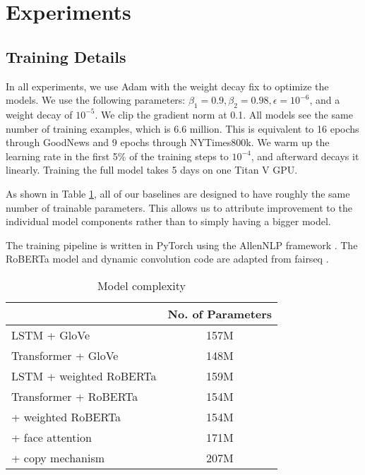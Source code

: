 

\section{Experiments}

\subsection{Training Details}

In all experiments, we use Adam \cite{Kingma2015Adam} with the weight decay fix
\cite{Loshchilov2018DecoupledWD} to optimize the models. We use the following
parameters: $\beta_1 = 0.9, \beta_2 = 0.98, \epsilon = 10^{-6}$, and a weight
decay of $10^{-5}$. We clip the gradient norm at 0.1. All models see the same
number of training examples, which is 6.6 million. This is equivalent to 16
epochs through GoodNews and 9 epochs through NYTimes800k. We warm up the
learning rate in the first 5\% of the training steps to $10^{-4}$, and
afterward decays it linearly. Training the full model takes 5 days on one Titan
V GPU.

As shown in Table \ref{tab:models}, all of our baselines are designed to have
roughly the same number of trainable parameters. This allows us to attribute
improvement to the individual model components rather than to simply having a
bigger model.

The training pipeline is written in PyTorch \cite{Paszke2017Automatic} using
the AllenNLP framework \cite{Gardner2017AllenNLP}. The RoBERTa model and
dynamic convolution code are adapted from fairseq \cite{Ott2019Fairseq}.

\begin{table}[t]
	\caption {Model complexity}
	\label{tab:models}
	\centering
	\begin{tabularx}{\linewidth}{Xc}
		\toprule
        & No. of Parameters \\
      \midrule
      LSTM + GloVe & 157M \\
      Transformer + GloVe & 148M \\
      LSTM + weighted RoBERTa & 159M \\
      \midrule
      Transformer + RoBERTa & 154M \\
      \quad + weighted RoBERTa & 154M \\
      \quad\quad + face attention & 171M \\
      \quad\quad\quad + copy mechanism & 207M \\
		\bottomrule
	\end{tabularx}
\end{table}

